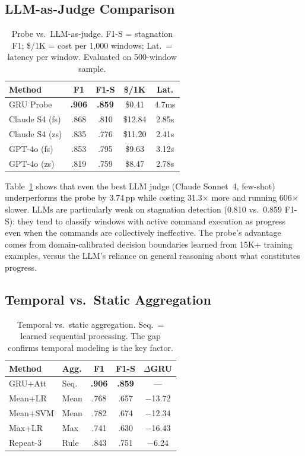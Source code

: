 \documentclass[11pt,a4paper]{article}
\begin{document}
\subsection{LLM-as-Judge Comparison}
\label{sec:llm-judge}

\begin{table}[t]
\centering
\small
\begin{tabular}{lcccc}
\toprule
\textbf{Method} & \textbf{F1} & \textbf{F1-S} & \textbf{\$/1K} & \textbf{Lat.} \\
\midrule
GRU Probe & \textbf{.906} & \textbf{.859} & \$0.41 & 4.7ms \\
Claude S4 (fs) & .868 & .810 & \$12.84 & 2.85s \\
Claude S4 (zs) & .835 & .776 & \$11.20 & 2.41s \\
GPT-4o (fs) & .853 & .795 & \$9.63 & 3.12s \\
GPT-4o (zs) & .819 & .759 & \$8.47 & 2.78s \\
\bottomrule
\end{tabular}
\caption{Probe vs.\ LLM-as-judge. F1-S = stagnation F1; \$/1K = cost per 1,000 windows; Lat.\ = latency per window. Evaluated on 500-window sample.}
\label{tab:llm-judge}
\end{table}

Table~\ref{tab:llm-judge} shows that even the best LLM judge (Claude Sonnet~4, few-shot) underperforms the probe by 3.74\,pp while costing 31.3$\times$ more and running 606$\times$ slower.
LLMs are particularly weak on stagnation detection (0.810 vs.\ 0.859 F1-S): they tend to classify windows with active command execution as progress even when the commands are collectively ineffective.
The probe's advantage comes from domain-calibrated decision boundaries learned from 15K+ training examples, versus the LLM's reliance on general reasoning about what constitutes progress.

\subsection{Temporal vs.\ Static Aggregation}

\begin{table}[t]
\centering
\small
\begin{tabular}{llccc}
\toprule
\textbf{Method} & \textbf{Agg.} & \textbf{F1} & \textbf{F1-S} & \textbf{$\Delta$GRU} \\
\midrule
GRU+Att & Seq. & \textbf{.906} & \textbf{.859} & --- \\
Mean+LR & Mean & .768 & .657 & $-$13.72 \\
Mean+SVM & Mean & .782 & .674 & $-$12.34 \\
Max+LR & Max & .741 & .630 & $-$16.43 \\
Repeat-3 & Rule & .843 & .751 & $-$6.24 \\
\bottomrule
\end{tabular}
\caption{Temporal vs.\ static aggregation. Seq.\ = learned sequential processing. The gap confirms temporal modeling is the key factor.}
\label{tab:temporal}
\end{table}
\end{document}
